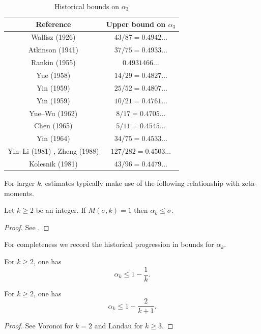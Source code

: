 \begin{table}[ht]
    \def\arraystretch{1.2}
    \centering
    \caption{Historical bounds on $\alpha_3$}
    \begin{tabular}{|c|c|}
    \hline
    Reference & Upper bound on $\alpha_3$\\
    \hline
    Walfisz (1926) \cite{walfisz_uber_1926} & $43/87 = 0.4942\ldots$\\
    \hline
    Atkinson (1941) \cite{atkinson_divisor_1941} & $37/75 = 0.4933\ldots$\\
    \hline
    Rankin (1955) \cite{rankin_van_1955} & $0.4931466\ldots$\\
    \hline
    Yue (1958) \cite{yuh_divisor_1958} & $14/29 = 0.4827\ldots$\\
    \hline
    Yin (1959) \cite{Yin_divisor_25_52} & $25/52 = 0.4807\ldots$\\
    \hline
    Yin (1959) \cite{Yin_divisor_10_21} & $10/21 = 0.4761\ldots$\\
    \hline
    Yue--Wu (1962) \cite{yuh_wu_divisor_1962} & $8/17 = 0.4705\ldots$\\
    \hline
    Chen (1965) \cite{chen_divisor_1965} & $5/11 = 0.4545\ldots$\\
    \hline
    Yin (1964) \cite{Yin_divisor_34_75} & $34/75 = 0.4533\ldots$\\
    \hline
    Yin--Li (1981) \cite{Yin-Li_divisor_127_282}, Zheng (1988) \cite{Zheng_divisor_127_282} & $127/282 = 0.4503\ldots$\\
    \hline
    Kolesnik (1981) \cite{kolesnik} & $43/96 = 0.4479\ldots$\\
    \hline
    \end{tabular}
\label{div-alpha3-table}
\end{table}


For larger $k$, estimates typically make use of the following relationship with zeta-moments.

\begin{lemma}\label{mas}  Let $k \geq 2$ be an integer. If $M(\sigma,k) = 1$ then $\alpha_k \leq \sigma$.
\end{lemma}

\begin{proof}  See \cite[\S 13.3]{ivic}.
\end{proof}

For completeness we record the historical progression in bounds for $\alpha_k$.
\begin{lemma}\label{piltz-alpha}
For $k \ge 2$, one has
\[
\alpha_k \le 1 - \frac{1}{k}.
\]
\end{lemma}
\begin{lemma}\label{voronoi-alpha}
For $k \ge 2$, one has
\[
\alpha_k \leq 1 - \frac{2}{k + 1}.
\]
\end{lemma}
\begin{proof}
See Voronoi \cite{voronoi_sur_1903} for $k = 2$ and Landau \cite{landau_uber_1912} for $k \ge 3$.
\end{proof}

